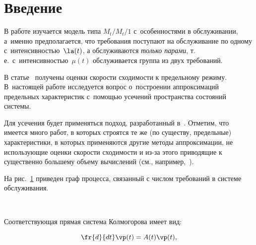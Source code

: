 
 \thispagestyle{headings}
 
 \vspace*{-19pt}


\section{Введение}

\vspace*{-4pt}

В работе изучается модель типа $M_t/M_t/1$ с~особенностями в обслуживании, 
а~именно предполагается, что требования поступают  на обслуживание по одному 
с~интенсивностью~$\la(t)$, а обслуживаются  \textit{только парами}, т.\,е.\ с~ин\-тен\-сив\-ностью~$\mu (t)$ 
обслуживается группа из двух требований.

В статье~\cite{articl1}  получены оценки скорости сходимости к предельному режиму.  
В~настоящей работе  исследуется вопрос о~построении аппроксимаций предельных характеристик 
с~по\-мощью усечений пространства состояний системы.

Для усечения будет применяться подход, разработанный в~\cite{articl2}. Отметим, что имеется много 
работ, в которых строятся те же (по существу, предельные) характеристики, в которых 
применяются другие методы аппроксимации, не использующие оценки скорости сходимости и из-за 
этого приводящие к существенно большему объему вычислений (см., например,~\cite{articl3, articl4}).

На рис.~\ref{fig1} приведен граф процесса, связанный с числом требований в системе обслуживания.
\begin{figure} %
\vspace*{1pt}
\begin{center}
 \mbox{%
 \epsfxsize=106.036mm 
 }
 \end{center}
\vspace*{-9pt}
\label{fig1}
\end{figure}
Соответствующая прямая система Колмогорова имеет вид:

\noindent
\begin{equation}
\fr{d}{dt}\vp(t)=A(t)\vp(t),
\label{ur01}
\end{equation}

